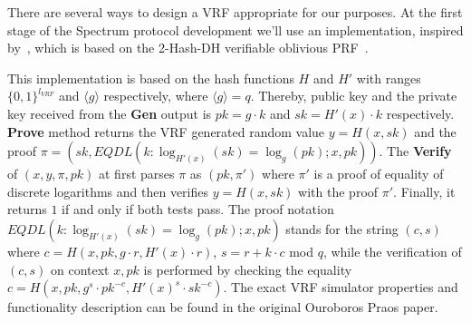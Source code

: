 There are several ways to design a VRF appropriate for our purposes.
At the first stage of the Spectrum protocol development we'll use an implementation, inspired by~\cite{cryptoeprint:2017/573}, which is based on the 2-Hash-DH verifiable oblivious PRF~\cite{asiacrypt:2014/233}.

This implementation is based on the hash functions $H$ and $H'$  with ranges $\{0,1\}^{l_{VRF}}$ and ${\langle g \rangle}$ respectively, where ${\langle g \rangle = q}$.
Thereby, public key and the private key received from the \textbf{Gen} output is ${pk = g \cdot k}$ and ${sk = H'(x) \cdot k}$ respectively.
\textbf{Prove} method returns the VRF generated random value ${y = H(x, sk)}$ and the proof ${\pi = (sk, EQDL(k : \log_{H'(x)}(sk) = \log_{g}(pk); x, pk))}$.
The \textbf{Verify} of ${(x, y, \pi, pk)}$ at first parses $\pi$ as ${(pk, \pi')}$ where $\pi'$ is a proof of equality of discrete logarithms and then verifies ${y = H(x, sk)}$ with the proof $\pi'$.
Finally, it returns $1$ if and only if both tests pass.
The proof notation ${EQDL(k : \log_{H'(x)}(sk) = \log_{g}(pk); x, pk)}$ stands for the string ${(c, s)}$ where $c = H(x, pk, g \cdot r, H'(x) \cdot r)$, ${s = r + k \cdot c}$ mod $q$, while the verification of ${(c, s)}$ on context ${x, pk}$ is performed by checking the equality
${c = H(x, pk, g^s \cdot pk^{-c}, H'(x)^s \cdot sk^{-c})}$.
The exact VRF simulator properties and functionality description can be found in the original Ouroboros Praos paper.

